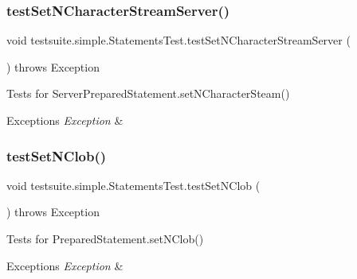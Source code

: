 \subsubsection{\texorpdfstring{test\+Set\+N\+Character\+Stream\+Server()}{testSetNCharacterStreamServer()}}
{\footnotesize\ttfamily void testsuite.\+simple.\+Statements\+Test.\+test\+Set\+N\+Character\+Stream\+Server (\begin{DoxyParamCaption}{ }\end{DoxyParamCaption}) throws Exception}

Tests for Server\+Prepared\+Statement.\+set\+N\+Character\+Steam()


\begin{DoxyExceptions}{Exceptions}
{\em Exception} & \\
\hline
\end{DoxyExceptions}
\mbox{\label{classtestsuite_1_1simple_1_1_statements_test_a31aad5a1989e2b9189e57c75eea14e52}} 
\subsubsection{\texorpdfstring{test\+Set\+N\+Clob()}{testSetNClob()}}
{\footnotesize\ttfamily void testsuite.\+simple.\+Statements\+Test.\+test\+Set\+N\+Clob (\begin{DoxyParamCaption}{ }\end{DoxyParamCaption}) throws Exception}

Tests for Prepared\+Statement.\+set\+N\+Clob()


\begin{DoxyExceptions}{Exceptions}
{\em Exception} & \\
\hline
\end{DoxyExceptions}
\mbox{\label{classtestsuite_1_1simple_1_1_statements_test_a92f5e47200bc8ffaad2c183619802e81}} 
